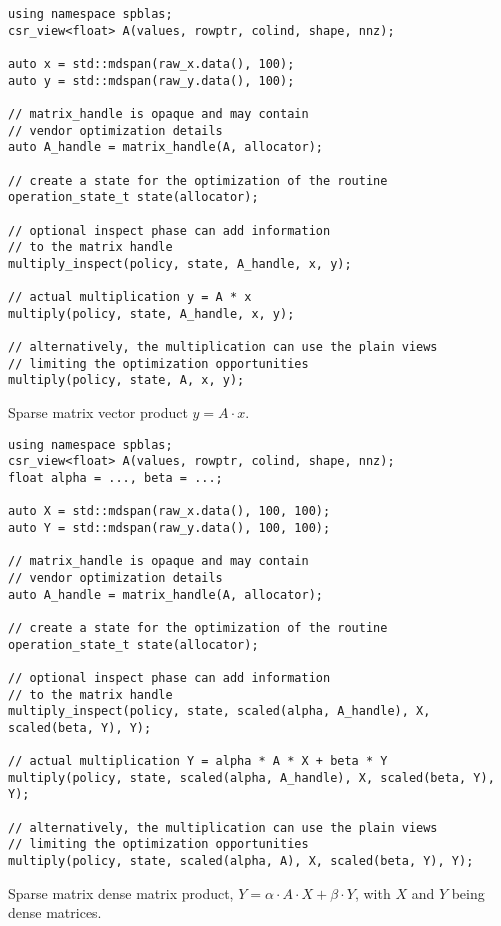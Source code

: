 \documentclass{article}
\begin{document}
\begin{listing}[H]
\begin{verbatim}
using namespace spblas;
csr_view<float> A(values, rowptr, colind, shape, nnz);

auto x = std::mdspan(raw_x.data(), 100);
auto y = std::mdspan(raw_y.data(), 100);

// matrix_handle is opaque and may contain 
// vendor optimization details
auto A_handle = matrix_handle(A, allocator);

// create a state for the optimization of the routine
operation_state_t state(allocator);

// optional inspect phase can add information 
// to the matrix handle
multiply_inspect(policy, state, A_handle, x, y);

// actual multiplication y = A * x
multiply(policy, state, A_handle, x, y); 

// alternatively, the multiplication can use the plain views
// limiting the optimization opportunities
multiply(policy, state, A, x, y); 
\end{verbatim}
\caption{Sparse matrix vector product $y = A \cdot x$.}
\end{listing}

\begin{listing}[H]
\begin{verbatim}
using namespace spblas;
csr_view<float> A(values, rowptr, colind, shape, nnz);
float alpha = ..., beta = ...;

auto X = std::mdspan(raw_x.data(), 100, 100);
auto Y = std::mdspan(raw_y.data(), 100, 100);

// matrix_handle is opaque and may contain
// vendor optimization details
auto A_handle = matrix_handle(A, allocator);

// create a state for the optimization of the routine
operation_state_t state(allocator);

// optional inspect phase can add information
// to the matrix handle
multiply_inspect(policy, state, scaled(alpha, A_handle), X, scaled(beta, Y), Y);

// actual multiplication Y = alpha * A * X + beta * Y
multiply(policy, state, scaled(alpha, A_handle), X, scaled(beta, Y), Y); 

// alternatively, the multiplication can use the plain views
// limiting the optimization opportunities
multiply(policy, state, scaled(alpha, A), X, scaled(beta, Y), Y); 
\end{verbatim}
\caption{Sparse matrix dense matrix product, $Y = \alpha \cdot A \cdot X + \beta \cdot Y$, with $X$ and $Y$ being dense matrices.}
\end{listing}
\end{document}
